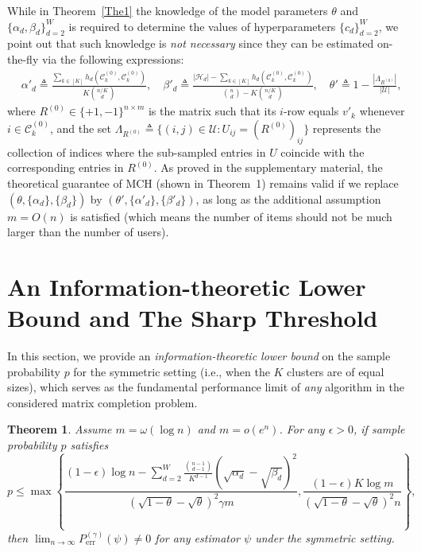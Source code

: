 \documentclass{article}
\newtheorem{theorem}{Theorem}
\begin{document}
While in Theorem~\ref{The1} the knowledge of the model parameters $\theta$ and $\{\alpha_d, \beta_d\}_{d=2}^{W}$ is required to determine the values of hyperparameters $\{c_d\}_{d=2}^W$, we point out that such knowledge is \emph{not necessary} since they can be estimated on-the-fly via the following expressions:
\begin{equation}\label{eq4}
    \begin{aligned}
         &\alpha'_d \triangleq \frac{ \sum_{k\in [K]} h_d(\mathcal{C}_k^{(0)}, \mathcal{C}_k^{(0)})}{ K\binom{n/K}{d}}, \quad  \beta'_d \triangleq \frac{ |\mathcal{H}_d| - \sum_{k\in [K]} h_d(\mathcal{C}_k^{(0)}, \mathcal{C}_k^{(0)})}{ \binom{n}{d} - K \binom{n/K}{d}} , \quad  \theta' \triangleq 1 -\frac{|\Lambda_{R^{(0)}}|}{|\mathcal{U}|}, 
    \end{aligned}
\end{equation}
where $R^{(0)} \in \{+1,-1\}^{n\times m}$ is the matrix such that its $i$-row equals $v'_k$ whenever $i\in \mathcal{C}_k^{(0)}$, and the set $\Lambda_{R^{(0)}} \triangleq \{ (i,j)\in \mathcal{U} : U_{ij}=(R^{(0)})_{ij} \}$ represents the collection of indices where the sub-sampled entries in $U$ coincide with the corresponding entries in $R^{(0)}$. As proved in the supplementary material, the theoretical guarantee of MCH (shown in Theorem~1) remains  valid if we replace $(\theta, \{\alpha_d\}, \{\beta_d \} )$ by $(\theta', \{\alpha'_d\}, \{\beta'_d \} )$, as long as the additional assumption $m = O(n)$ is satisfied (which means the number of items should not be much larger than the number of users).







\section{An Information-theoretic Lower Bound and The Sharp Threshold}\label{sec:lower_bound}

In this section, we provide an \emph{information-theoretic lower bound} on the sample probability $p$ for the symmetric setting (i.e., when the $K$ clusters are of equal sizes), which serves as the fundamental performance limit of \emph{any} algorithm in the considered matrix completion problem. 

\begin{theorem}\label{The2}
Assume $m=\omega(\log n)$ and $m=o(e^n)$. For any $\epsilon > 0$, if sample probability $p$ satisfies   
    \begin{equation}\label{eq5}
        p \leq \max \left\{ \frac{(1-\epsilon)\log n - \sum_{d=2}^{W} \frac{\binom{n-1}{d-1}}{K^{d-1}} (\sqrt{\alpha_d}-\sqrt{\beta_d})^2}{(\sqrt{1-\theta} - \sqrt{\theta})^2 \gamma m}, \frac{ (1-\epsilon) K \log m}{(\sqrt{1-\theta} - \sqrt{\theta})^2 n} \right\}, 
    \end{equation}
    then $\lim_{n \rightarrow \infty }P_{\mathrm{err}}^{(\gamma)}(\psi) \neq 0$ for any estimator $\psi$ under the  symmetric setting.
\end{theorem}
\end{document}
